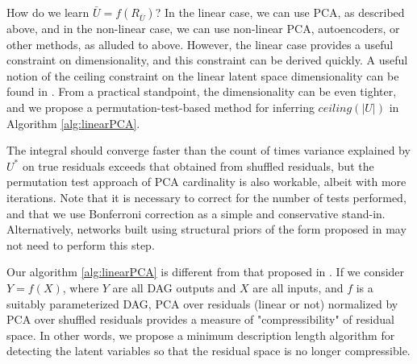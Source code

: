 \documentclass{article}
\begin{document}
How do we learn $\bar{U} = f(R_{\bar{U}})$?  In the linear case, we can use PCA, as described above, and in the non-linear case, we can use non-linear PCA, autoencoders, or other methods, as alluded to above.  However, the linear case provides a useful constraint on dimensionality, and this constraint can be derived quickly.  A useful notion of the ceiling constraint on the linear latent space dimensionality can be found in \cite{gavish_optimal_2014}.  From a practical standpoint, the dimensionality can be even tighter, and we propose a permutation-test-based method for inferring $ceiling(|U|)$ in Algorithm \ref{alg:linearPCA}.

The integral should converge faster than the count of times variance explained by $U^{*}$ on true residuals exceeds that obtained from shuffled residuals, but the permutation test approach of PCA cardinality is also workable, albeit with more iterations.  Note that it is necessary to correct for the number of tests performed, and that we use Bonferroni correction as a simple and conservative stand-in. Alternatively, networks built using structural priors of the form proposed in \cite{friedman_being_2013} may not need to perform this step.

Our algorithm \ref{alg:linearPCA} is different from that proposed in \cite{elidan_learning_2005}.  If we consider $Y = f(X)$, where $Y$ are all DAG outputs and $X$ are all inputs, and $f$ is a suitably parameterized DAG, PCA over residuals (linear or not) normalized by PCA over shuffled residuals provides a measure of "compressibility" of residual space.  In other words, we propose a minimum description length algorithm for detecting the latent variables so that the residual space is no longer compressible.
\end{document}
